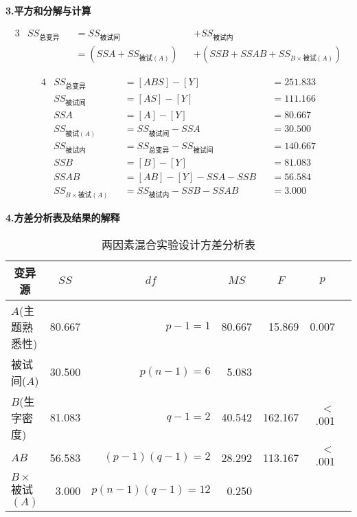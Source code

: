 \textbf{3.平方和分解与计算}
\begin{definition}[两因素混合实验设计平方和分解]
\begin{alignat*}{3}
    &  SS_{\text{总变异}}    &&=    SS_{\text{被试间}} &&+    SS_{\text{被试内}} \\
    &                       &&=    \left( SSA + SS_{\text{被试} \left( A \right) } \right)  &&+    \left( SSB + SSAB + SS_{B\times \text{被试} \left( A \right) } \right)
\end{alignat*}
\end{definition}

\begin{alignat*}{4}
    &  SS_{\text{总变异}}    &&=    [ABS] - [Y]    &&=    251.833\\
    &  SS_{\text{被试间}}    &&=    [AS]  - [Y]    &&=    111.166\\
    &  SSA                   &&=    [A]   - [Y]   &&=    80.667\\
    &  SS_{\text{被试}\left( A \right)}    &&=    SS_{\text{被试间}} - SSA     &&= 30.500\\
    &  SS_{\text{被试内}}    &&=    SS_{\text{总变异}} - SS_{\text{被试间}}    &&= 140.667\\
    &  SSB                   &&=    [B] - [Y]     &&=    81.083\\
    &  SSAB                  &&=    [AB]- [Y] -SSA -SSB     &&=56.584\\
    &  SS_{B \times \text{被试} \left( A \right)}    &&=    SS_{\text{被试内}} - SSB - SSAB    &&=    3.000
\end{alignat*}

\textbf{4.方差分析表及结果的解释}

\begin{table*}
	\centering
	\caption{两因素混合实验设计方差分析表}
	\label{two_way_mixed_ANOVA_tab}
	{
                    \begin{tabular}{lrrrrrr}
		    \toprule
			\multicolumn{1}{c}{变异源} & \multicolumn{1}{c}{$SS$} & \multicolumn{1}{c}{$df$} & \multicolumn{1}{c}{$MS$} & \multicolumn{1}{c}{$F$} & \multicolumn{1}{c}{$p$} \\
		    \midrule
		    	$A$(主题熟悉性) & 80.667 & $p-1=1$ & 80.667 & 15.869 & 0.007  \\
			被试间($A$) & 30.500 & $p(n-1)=6$ & 5.083 &  &    \\
		    \midrule
			$B$(生字密度) & 81.083 & $q-1=2$ & 40.542 & 162.167 & $<$ .001  \\
			$AB$ & 56.583 & $(p-1)(q-1)=2$ & 28.292 & 113.167 & $<$ .001  \\
			$B\times$被试$(A)$ & 3.000 & $p(n-1)(q-1)=12$ & 0.250 &  &    \\
		    \bottomrule
		\end{tabular}
	}
\end{table*}

